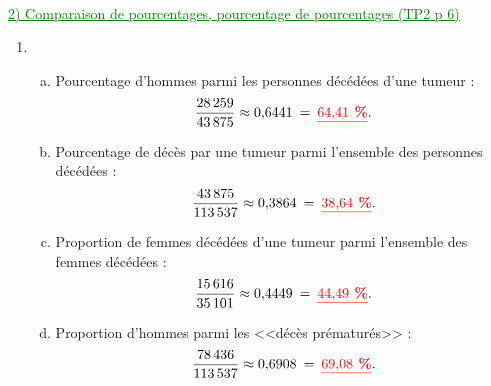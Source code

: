 \documentclass[xcolor={dvipsnames}]{beamer}
\begin{document}
\begin{frame}
\


\textcolor{Green}{\underline{2) Comparaison de pourcentages, pourcentage de pourcentages (TP2 p 6)}}
\end{frame}

\begin{frame}
	\begin{enumerate}
		\item \begin{enumerate}[a)]
			\item Pourcentage d'hommes parmi les personnes décédées d'une tumeur :\pause
			\begin{equation*}
				\dfrac{\num{28259}}{\num{43875}} \approx \num{0.6441} \: = \: \textcolor{red}{\underline{\textbf{\num{64.41} \%}}}.
			\end{equation*} \pause
			
			\item Pourcentage de décès par une tumeur parmi l'ensemble des personnes décédées :\pause
			\begin{equation*}
				\dfrac{\num{43875}}{\num{113537}} \approx \num{0.3864}\: = \: \textcolor{red}{\underline{\textbf{\num{38.64} \%}}}.
			\end{equation*}\pause
			
			\item Proportion de femmes décédées d'une tumeur parmi l'ensemble des femmes décédées :\pause
			\begin{equation*}
				\dfrac{\num{15616}}{\num{35101}} \approx \num{0.4449} \: = \: \textcolor{red}{\underline{\textbf{\num{44.49} \%}}}.
			\end{equation*}\pause
			
			\item Proportion d'hommes parmi les <<décès prématurés>> :\pause
			\begin{equation*}
				\dfrac{\num{78436}}{\num{113537}} \approx \num{0.6908} \: = \: \textcolor{red}{\underline{\textbf{\num{69.08} \%}}}.
			\end{equation*}
		\end{enumerate}
	\end{enumerate}
\end{frame}
\end{document}
